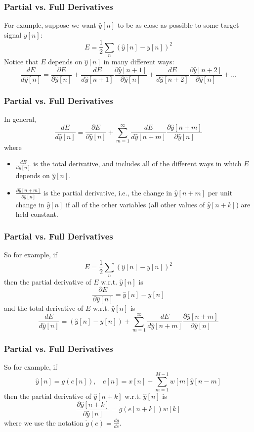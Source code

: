\documentclass{beamer}
\begin{document}
\begin{frame}
  \frametitle{Partial vs. Full Derivatives}

  For example, suppose we want $\hat{y}[n]$ to be as close as possible to
  some target signal $y[n]$:
  \[
  E = \frac{1}{2}\sum_n \left(\hat{y}[n]-y[n]\right)^2
  \]
  Notice that $E$ depends on $\hat{y}[n]$ in many different ways:
  \[
  \frac{dE}{d\hat{y}[n]}=\frac{\partial E}{\partial \hat{y}[n]}+
  \frac{dE}{d\hat{y}[n+1]}\frac{\partial \hat{y}[n+1]}{\partial \hat{y}[n]}+
  \frac{dE}{d\hat{y}[n+2]}\frac{\partial \hat{y}[n+2]}{\partial \hat{y}[n]}+\ldots
  \]
\end{frame}
\begin{frame}
  \frametitle{Partial vs. Full Derivatives}
  In general,
  \[
  \frac{dE}{d\hat{y}[n]}=\frac{\partial E}{\partial \hat{y}[n]}+
  \sum_{m=1}^\infty\frac{dE}{d\hat{y}[n+m]}\frac{\partial \hat{y}[n+m]}{\partial \hat{y}[n]}
  \]
  where
  \begin{itemize}
    \item $\frac{dE}{d\hat{y}[n]}$ is the total derivative, and includes all
      of the different ways in which $E$ depends on $\hat{y}[n]$.
    \item $\frac{\partial \hat{y}[n+m]}{\partial \hat{y}[n]}$ is the partial
      derivative, i.e., the change in $\hat{y}[n+m]$ per unit change in
      $\hat{y}[n]$ if all of the other variables (all other values of
      $\hat{y}[n+k]$) are held constant.
  \end{itemize}
\end{frame}

\begin{frame}
  \frametitle{Partial vs. Full Derivatives}

  So for example, if
  \[
  E = \frac{1}{2}\sum_n \left(\hat{y}[n]-y[n]\right)^2
  \]
  then the partial derivative of $E$ w.r.t. $\hat{y}[n]$ is 
  \[
  \frac{\partial E}{\partial\hat{y}[n]}= \hat{y}[n]-y[n]
  \]
  and the total derivative of $E$ w.r.t. $\hat{y}[n]$ is 
  \[
  \frac{dE}{d\hat{y}[n]}=\left(\hat{y}[n]-y[n]\right)+
  \sum_{m=1}^\infty\frac{dE}{d\hat{y}[n+m]}\frac{\partial\hat{y}[n+m]}{\partial\hat{y}[n]}
  \]
\end{frame}

\begin{frame}
  \frametitle{Partial vs. Full Derivatives}

  So for example, if
  \[
  \hat{y}[n] =g(e[n]),~~~~e[n]=x[n]+\sum_{m=1}^{M-1}w[m]\hat{y}[n-m]
  \]
  then the partial derivative of $\hat{y}[n+k]$ w.r.t. $\hat{y}[n]$ is 
  \[
  \frac{\partial\hat{y}[n+k]}{\partial\hat{y}[n]}= \dot{g}(e[n+k]) w[k] 
  \]
  where we use the notation $\dot{g}(e)=\frac{dg}{de}$.
\end{frame}
\end{document}
